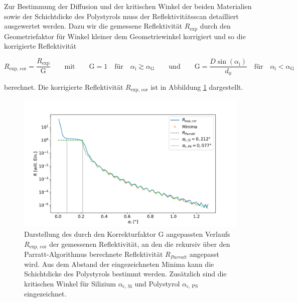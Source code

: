     \FloatBarrier

    Zur Bestimmung der Diffusion und der kritischen Winkel der beiden Materialien sowie der Schichtdicke des Polystyrols muss der Reflektivitätsscan detailliert ausgewertet werden. Dazu wir die gemessene 
    Reflektivität $R_{\text{exp}}$ durch den Geometriefaktor für Winkel kleiner dem Geometriewinkel korrigiert und so die korrigierte Reflektivität

    \begin{equation*}
      R_{\text{exp, cor}} = \frac{R_{\text{exp}}}{\text{G}} \qquad \text{mit} \qquad \text{G}=1 \quad \text{für} \quad \alpha_{\text{i}} \gtrsim \alpha_{\text{G}} \qquad \text{und} \qquad \text{G}=\frac{D\sin\left(\alpha_{\text{i}}\right)}{d_0} \quad \text{für} \quad \alpha_{\text{i}} < \alpha_{\text{G}}
    \end{equation*}

    berechnet. Die korrigierte Reflektivität $R_{\text{exp, cor}}$ ist in Abbildung \ref{fig:Reflektivität} dargestellt. 

    \FloatBarrier
    \begin{figure}[h]
        \centering
        \includegraphics[width = \textwidth]{reflectivity_cor.pdf}
        \caption{Darstellung des durch den Korrekturfaktor G angepassten Verlaufs $R_{\text{exp, cor}}$ der gemessenen Reflektivität, an den die rekursiv über den Parratt-Algorithmus berechnete Reflektivität $R_{Parratt}$ angepasst wird. Aus dem Abstand der eingezeichneten Minima kann die Schichtdicke des Polystyrols bestimmt werden. Zusätzlich sind die kritischen Winkel für Silizium $\alpha_{\text{c, Si}}$ und Polystyrol $\alpha_{\text{c, PS}}$ eingezeichnet.}
        \label{fig:Reflektivität}
      \end{figure}
   
